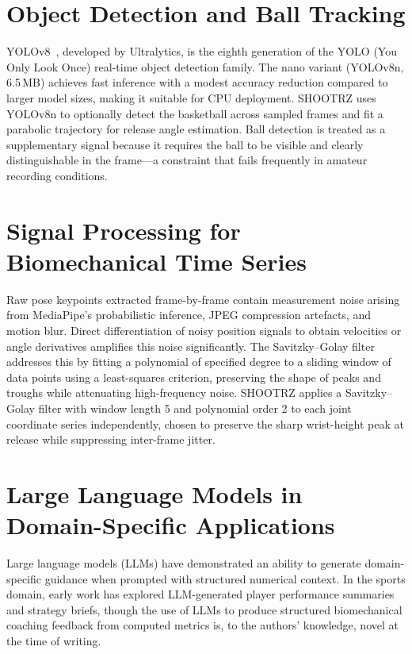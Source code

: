 \section{Object Detection and Ball Tracking}
\label{sec:object_detection}

YOLOv8~\cite{Jocher2023}, developed by Ultralytics, is the eighth generation of the YOLO (You Only Look Once) real-time object detection family. The nano variant (YOLOv8n, 6.5\,MB) achieves fast inference with a modest accuracy reduction compared to larger model sizes, making it suitable for CPU deployment. SHOOTRZ uses YOLOv8n to optionally detect the basketball across sampled frames and fit a parabolic trajectory for release angle estimation. Ball detection is treated as a supplementary signal because it requires the ball to be visible and clearly distinguishable in the frame---a constraint that fails frequently in amateur recording conditions.

\section{Signal Processing for Biomechanical Time Series}
\label{sec:signal_processing}

Raw pose keypoints extracted frame-by-frame contain measurement noise arising from MediaPipe's probabilistic inference, JPEG compression artefacts, and motion blur. Direct differentiation of noisy position signals to obtain velocities or angle derivatives amplifies this noise significantly. The Savitzky--Golay filter~\cite{Savitzky1964} addresses this by fitting a polynomial of specified degree to a sliding window of data points using a least-squares criterion, preserving the shape of peaks and troughs while attenuating high-frequency noise. SHOOTRZ applies a Savitzky--Golay filter with window length 5 and polynomial order 2 to each joint coordinate series independently, chosen to preserve the sharp wrist-height peak at release while suppressing inter-frame jitter.

\section{Large Language Models in Domain-Specific Applications}
\label{sec:llm}

Large language models (LLMs) have demonstrated an ability to generate domain-specific guidance when prompted with structured numerical context. In the sports domain, early work has explored LLM-generated player performance summaries and strategy briefs, though the use of LLMs to produce structured biomechanical coaching feedback from computed metrics is, to the authors' knowledge, novel at the time of writing.

